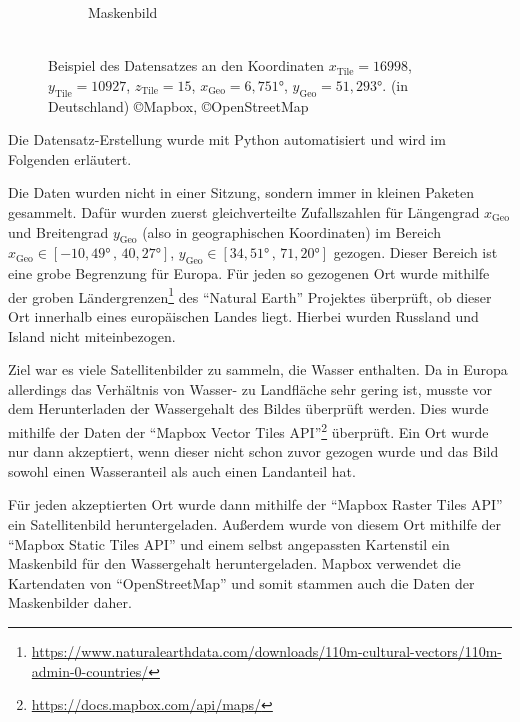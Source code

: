 \begin{figure}
\begin{subfigure}{0.3\textwidth}
        \caption{Maskenbild}
        \label{fig:datensatz_beispiel_maske.png}
    \end{subfigure}
    \caption{\\Beispiel des Datensatzes an den Koordinaten %
            ${x_\text{Tile} = 16998}$, ${y_\text{Tile} = 10927}$, ${z_\text{Tile} = 15}$, %
            ${x_\text{Geo} = 6,751°}$, ${y_\text{Geo} = 51,293°}$. %
            (in Deutschland) \copyright Mapbox, \copyright OpenStreetMap}
    \label{fig:datensatz_beispiel}
\end{figure}

Die Datensatz-Erstellung wurde mit Python automatisiert und wird im Folgenden erläutert.

Die Daten wurden nicht in einer Sitzung, sondern immer in kleinen Paketen gesammelt.
Dafür wurden zuerst gleichverteilte Zufallszahlen für Längengrad $x_\text{Geo}$ und Breitengrad $y_\text{Geo}$ (also in geographischen Koordinaten) 
im Bereich ${x_\text{Geo} \in [-10,49° \,,\, 40,27°]}$, ${y_\text{Geo} \in [34,51° \,,\, 71,20°]}$ gezogen.
Dieser Bereich ist eine grobe Begrenzung für Europa.
Für jeden so gezogenen Ort wurde mithilfe der groben Ländergrenzen\footnote{\url{https://www.naturalearthdata.com/downloads/110m-cultural-vectors/110m-admin-0-countries/}} des \enquote{Natural Earth} Projektes überprüft, 
ob dieser Ort innerhalb eines europäischen Landes liegt. \cite{natural_earth}
Hierbei wurden Russland und Island nicht miteinbezogen.

Ziel war es viele Satellitenbilder zu sammeln, die Wasser enthalten.
Da in Europa allerdings das Verhältnis von Wasser- zu Landfläche sehr gering ist, musste vor dem Herunterladen der Wassergehalt des Bildes überprüft werden.
Dies wurde mithilfe der Daten der \enquote{Mapbox Vector Tiles API}\footnote{\url{https://docs.mapbox.com/api/maps/}\label{mapbox_api}} überprüft. \cite{mapbox}
Ein Ort wurde nur dann akzeptiert, wenn dieser nicht schon zuvor gezogen wurde und das Bild sowohl einen Wasseranteil als auch einen Landanteil hat.

Für jeden akzeptierten Ort wurde dann mithilfe der \enquote{Mapbox Raster Tiles API} ein Satellitenbild heruntergeladen.
Außerdem wurde von diesem Ort mithilfe der \enquote{Mapbox Static Tiles API} und einem selbst angepassten Kartenstil ein Maskenbild für den Wassergehalt heruntergeladen.\cite{mapbox}
Mapbox verwendet die Kartendaten von \enquote{OpenStreetMap} und somit stammen auch die Daten der Maskenbilder daher.\cite{OpenStreetMap}

